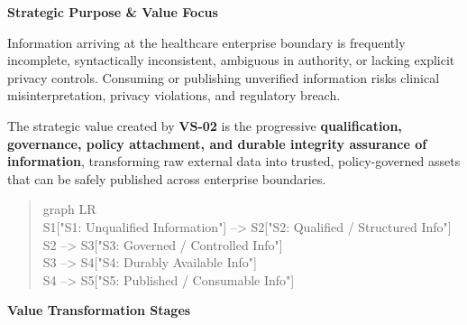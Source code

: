 \par\medskip\textbf{Strategic Purpose \& Value Focus}\par


Information arriving at the healthcare enterprise boundary is frequently incomplete, syntactically inconsistent, ambiguous in authority, or lacking explicit privacy controls. Consuming or publishing unverified information risks clinical misinterpretation, privacy violations, and regulatory breach.



The strategic value created by \textbf{VS-02} is the progressive \textbf{qualification, governance, policy attachment, and durable integrity assurance of information}, transforming raw external data into trusted, policy-governed assets that can be safely published across enterprise boundaries.



\begin{quote}\small\ttfamily
graph LR\\
    S1["S1: Unqualified Information"] --> S2["S2: Qualified / Structured Info"]\\
    S2 --> S3["S3: Governed / Controlled Info"]\\
    S3 --> S4["S4: Durably Available Info"]\\
    S4 --> S5["S5: Published / Consumable Info"]\\

\end{quote}


\par\medskip\textbf{Value Transformation Stages}\par


